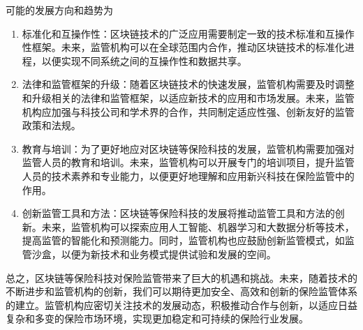 \documentclass[a4paper,12pt]{ctexart}
\begin{document}
可能的发展方向和趋势为
\begin{enumerate}
    \item 标准化和互操作性：区块链技术的广泛应用需要制定一致的技术标准和互操作性框架。未来，监管机构可以在全球范围内合作，推动区块链技术的标准化进程，以便实现不同系统之间的互操作性和数据共享。
    \item 法律和监管框架的升级：随着区块链技术的快速发展，监管机构需要及时调整和升级相关的法律和监管框架，以适应新技术的应用和市场发展。未来，监管机构应加强与科技公司和学术界的合作，共同制定适应性强、创新友好的监管政策和法规。
    \item 教育与培训：为了更好地应对区块链等保险科技的发展，监管机构需要加强对监管人员的教育和培训。未来，监管机构可以开展专门的培训项目，提升监管人员的技术素养和专业能力，以便更好地理解和应用新兴科技在保险监管中的作用。
    \item 创新监管工具和方法：区块链等保险科技的发展将推动监管工具和方法的创新。未来，监管机构可以探索应用人工智能、机器学习和大数据分析等技术，提高监管的智能化和预测能力。同时，监管机构也应鼓励创新监管模式，如监管沙盒，以便为新技术和业务模式提供试验和发展的空间。
\end{enumerate}
总之，区块链等保险科技对保险监管带来了巨大的机遇和挑战。未来，随着技术的不断进步和监管机构的创新，我们可以期待更加安全、高效和创新的保险监管体系的建立。监管机构应密切关注技术的发展动态，积极推动合作与创新，以适应日益复杂和多变的保险市场环境，实现更加稳定和可持续的保险行业发展。
\nocite{*}
\printbibliography
\end{document}
